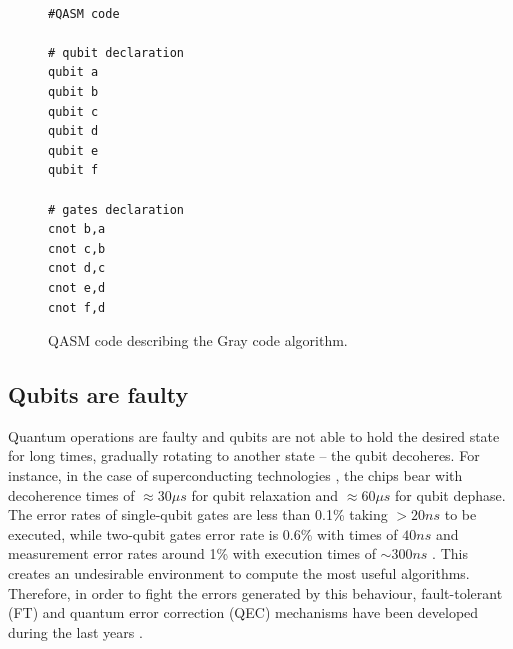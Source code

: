 \begin{figure}
\centering
\begin{minipage}{.45\textwidth}

\begin{verbatim}

#QASM code

# qubit declaration
qubit a
qubit b
qubit c
qubit d
qubit e
qubit f

# gates declaration
cnot b,a
cnot c,b
cnot d,c
cnot e,d
cnot f,d

\end{verbatim}

\caption{QASM code describing the Gray code algorithm.}
\label{code:qasm_gray_code}
\end{minipage}
\end{figure}

\subsection*{Qubits are faulty}
\label{sec:org873115d}
Quantum operations are faulty and qubits are not able to hold the desired state for long times, gradually rotating to another state -- the qubit decoheres.
For instance, in the case of superconducting technologies \cite{O_Brien_2017}, the chips bear with decoherence times of \(\approx 30 \mu s\) for qubit relaxation and \(\approx 60 \mu s\) for qubit dephase.
The error rates of single-qubit gates are less than 0.1\% taking \(> 20 ns\) to be executed, while two-qubit gates error rate is 0.6\% with times of \(40 ns\) and measurement error rates around 1\% with execution times of \(\sim 300 ns\) \cite{O_Brien_2017,Versluis_2017}.
This creates an undesirable environment to compute the most useful algorithms.
Therefore, in order to fight the errors generated by this behaviour, fault-tolerant (FT) and quantum error correction (QEC) mechanisms have been developed during the last years \cite{Nielsen_2009}.

